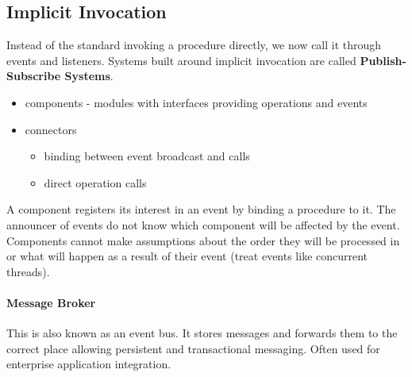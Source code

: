 \documentclass{article}
\begin{document}
\subsection*{Implicit Invocation} %
\label{sub:implicit_invocation}
Instead of the standard invoking a procedure directly, we now call it through events and listeners. Systems built around implicit invocation are called \textbf{Publish-Subscribe Systems}.
\begin{itemize}
    \item components - modules with interfaces providing operations and events
    \item connectors
    \begin{itemize}
        \item binding between event broadcast and calls
        \item direct operation calls
    \end{itemize}
\end{itemize}
A component registers its interest in an event by binding a procedure to it. The announcer of events do not know which component will be affected by the event. Components cannot make assumptions about the order they will be processed in or what will happen as a result of their event (treat events like concurrent threads).

\paragraph{Message Broker} %
\label{par:message_broker}
This is also known as an event bus. It stores messages and forwards them to the correct place allowing persistent and transactional messaging. Often used for enterprise application integration.
\end{document}
